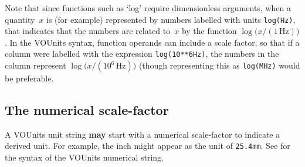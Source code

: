 \documentclass[11pt,a4paper]{ivoa}
\newcommand{\unit}[1]{\texttt{\small\color{orange}#1}}
\newcommand*\norm[1]{\textbf{\color{ivoacolor}#1}}
\def\eg{e.g.,~}
\begin{document}
Note that since functions such as `log' require dimensionless
arguments, when a quantity~$x$ is (for example) represented by numbers
labelled with units \unit{log(Hz)}, that indicates that the numbers
are related to~$x$ by the function
$\log\bigl(x/(\mathrm{1\,Hz})\bigr)$.  In the VOUnits syntax, function
operands can include a scale factor, so that if a column were
labelled with the expression \unit{log(10**6Hz)}, the numbers in the
column represent $\log\bigl(x/(\mathrm{10^6\,Hz})\bigr)$ (though
representing this as \unit{log(MHz)} would be preferable.

%
%
%
%

\subsection{The numerical scale-factor\label{sec:scalefactor}}

A VOUnits unit string \norm{may} start with a numerical scale-factor
to indicate a derived unit.  For example, the inch might appear as the
unit of \unit{25.4mm}.  See  for the syntax
of the VOUnits numerical string.
\end{document}
